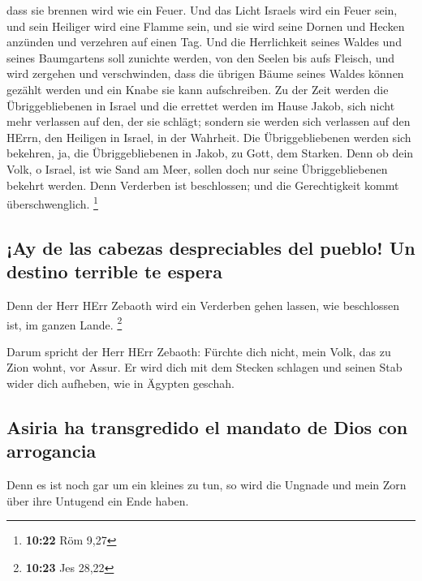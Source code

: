 dass sie brennen wird wie ein Feuer.  Und das Licht
Israels wird ein Feuer sein, und sein Heiliger wird eine Flamme sein,
und sie wird seine Dornen und Hecken anzünden und verzehren auf einen
Tag.  Und die Herrlichkeit seines Waldes und seines
Baumgartens soll zunichte werden, von den Seelen bis aufs Fleisch, und
wird zergehen und verschwinden,  dass die übrigen Bäume
seines Waldes können gezählt werden und ein Knabe sie kann aufschreiben.
 Zu der Zeit werden die Übriggebliebenen in Israel und
die errettet werden im Hause Jakob, sich nicht mehr verlassen auf den,
der sie schlägt; sondern sie werden sich verlassen auf den HErrn, den
Heiligen in Israel, in der Wahrheit.  Die
Übriggebliebenen werden sich bekehren, ja, die Übriggebliebenen in
Jakob, zu Gott, dem Starken.  Denn ob dein Volk, o
Israel, ist wie Sand am Meer, sollen doch nur seine Übriggebliebenen
bekehrt werden. Denn Verderben ist beschlossen; und die Gerechtigkeit
kommt überschwenglich. \footnote{\textbf{10:22} Röm 9,27}

\hypertarget{ay-de-las-cabezas-despreciables-del-pueblo-un-destino-terrible-te-espera}{%
\subsection{¡Ay de las cabezas despreciables del pueblo! Un destino
terrible te
espera}\label{ay-de-las-cabezas-despreciables-del-pueblo-un-destino-terrible-te-espera}}

 Denn der Herr HErr Zebaoth wird ein Verderben gehen
lassen, wie beschlossen ist, im ganzen Lande. \footnote{\textbf{10:23}
  Jes 28,22}

 Darum spricht der Herr HErr Zebaoth: Fürchte dich nicht,
mein Volk, das zu Zion wohnt, vor Assur. Er wird dich mit dem Stecken
schlagen und seinen Stab wider dich aufheben, wie in Ägypten geschah.

\hypertarget{asiria-ha-transgredido-el-mandato-de-dios-con-arrogancia}{%
\subsection{Asiria ha transgredido el mandato de Dios con
arrogancia}\label{asiria-ha-transgredido-el-mandato-de-dios-con-arrogancia}}

 Denn es ist noch gar um ein kleines zu tun, so wird die
Ungnade und mein Zorn über ihre Untugend ein Ende haben.

